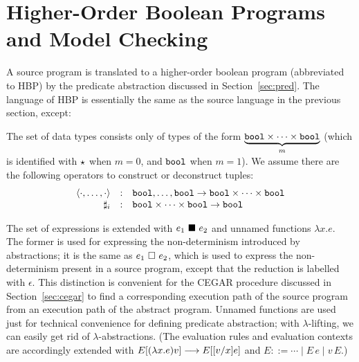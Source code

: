 \section{Higher-Order Boolean Programs and Model Checking}
\label{sec:boolean}

A source program is translated to a higher-order boolean program 
(abbreviated to HBP) by the predicate abstraction discussed in 
Section~\ref{sec:pred}. The language of HBP is essentially the same as 
the source language in the previous section, except:
\begin{asparaitem}
\item The set of data types consists only of types of the form 
\(\underbrace{\mathtt{bool}\times \cdots \times \mathtt{bool}}_m\) (which is 
identified with \(\star\) when \(m=0\), and \(\mathtt{bool}\) when \(m=1\)). 
We assume there are the following operators to construct or deconstruct 
tuples:
\[
\begin{array}{rcl}
\tuple{\cdot,\ldots,\cdot}&:&{\TBOOL,\ldots,\TBOOL\ra \TBOOL\times \cdots \times\TBOOL}\\
\NTH{i}&:&{\TBOOL\times\cdots\times\TBOOL\ra \TBOOL}
\end{array}
\]
\item The set of expressions is extended with \(e_1\ \blacksquare\ e_2\) and 
unnamed functions \(\lambda x.e\). The former is used for expressing the 
non-determinism introduced by abstractions; it is the same as 
\(e_1\ \square\ e_2\), which is used to express the non-determinism present 
in a source program, except that the reduction is labelled with 
\(\epsilon\). This distinction is convenient for the CEGAR 
procedure discussed in Section~\ref{sec:cegar} to find a corresponding 
execution path of the source program from an execution path of the 
abstract program.
%
Unnamed functions are used just for technical convenience for defining 
predicate abstraction;
with \(\lambda\)-lifting, we can easily get rid of 
\(\lambda\)-abstractions. (The evaluation rules and evaluation contexts 
are accordingly extended with \(E[(\lambda x.e)v]\longrightarrow E[[v/x]e]\) and 
\(E ::= \cdots \mid E\,e\mid v\,E\).)
\end{asparaitem}


